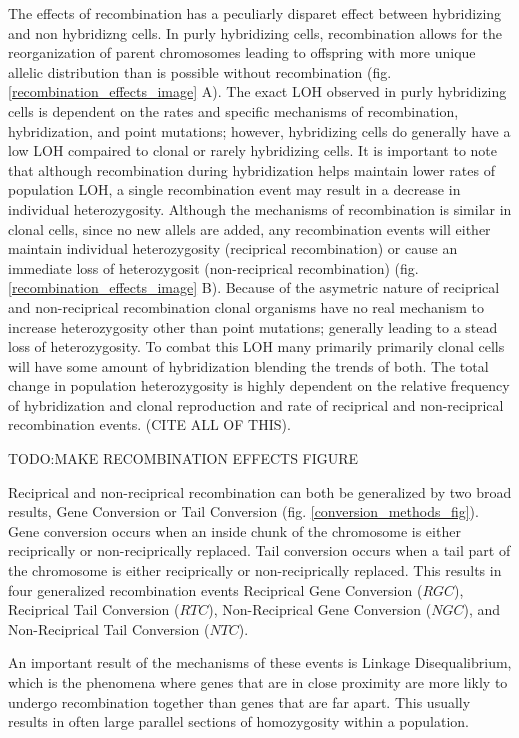 \documentclass{article}
\begin{document}
    The effects of recombination has a peculiarly disparet effect between hybridizing and non hybridizng cells.  In purly hybridizing cells, recombination allows for the reorganization of parent chromosomes leading to offspring with more unique allelic distribution than is possible without recombination (fig. \ref{recombination_effects_image} A). The exact LOH observed in purly hybridizing cells is dependent on the rates and specific mechanisms of recombination, hybridization, and point mutations; however, hybridizing cells do generally have a low LOH compaired to clonal or rarely hybridizing cells.  It is important to note that although recombination during hybridization helps maintain lower rates of population LOH, a single recombination event may result in a decrease in individual heterozygosity.  Although the mechanisms of recombination is similar in clonal cells, since no new allels are added, any recombination events will either maintain individual heterozygosity (reciprical recombination) or cause an immediate loss of heterozygosit (non-reciprical recombination) (fig. \ref{recombination_effects_image} B).  Because of the asymetric nature of reciprical and non-reciprical recombination clonal organisms have no real mechanism to increase heterozygosity other than point mutations; generally leading to a stead loss of heterozygosity.  To combat this LOH many primarily primarily clonal cells will have some amount of hybridization blending the trends of both.  The total change in population heterozygosity is highly dependent on the relative frequency of hybridization and clonal reproduction and rate of reciprical and non-reciprical recombination events. (CITE ALL OF THIS).\bigskip

        TODO:MAKE RECOMBINATION EFFECTS FIGURE\bigskip
    
    Reciprical and non-reciprical recombination can both be generalized by two broad results, Gene Conversion or Tail Conversion (fig. \ref{conversion_methods_fig}).  Gene conversion occurs when an inside chunk of the chromosome is either reciprically or non-reciprically replaced.  Tail conversion occurs when a tail part of the chromosome is either reciprically or non-reciprically replaced.  This results in four generalized recombination events Reciprical Gene Conversion (\(RGC\)), Reciprical Tail Conversion (\(RTC\)), Non-Reciprical Gene Conversion (\(NGC\)), and Non-Reciprical Tail Conversion (\(NTC\)).

    An important result of the mechanisms of these events is Linkage Disequalibrium, which is the phenomena where genes that are in close proximity are more likly to undergo recombination together than genes that are far apart.  This usually results in often large parallel sections of homozygosity within a population.
\end{document}
